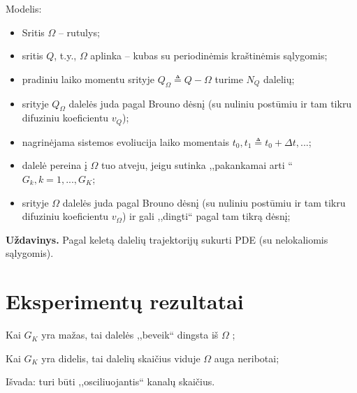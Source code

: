 \documentclass[10pt,a4paper]{article}
\begin{document}
Modelis:
\begin{itemize}
\item Sritis $\Omega$ – rutulys;
\item sritis $Q$, t.y.,    $\Omega$ aplinka – kubas su periodinėmis kraštinėmis sąlygomis;
\item pradiniu laiko momentu srityje $Q_\Omega \triangleq Q - \Omega$ turime $N_Q$ dalelių;
\item srityje $Q_\Omega$ dalelės juda pagal Brouno dėsnį (su nuliniu postūmiu ir tam tikru difuziniu koeficientu $v_Q$); 
\item nagrinėjama sistemos evoliucija  laiko momentais $t_0, t_1 \triangleq t_0 + \Delta t, ...$;
\item  dalelė pereina į $\Omega$ tuo atveju, jeigu sutinka ,,pakankamai arti `` $G_k, k=1,...,G_K$; 
\item srityje $\Omega$ dalelės juda pagal Brouno dėsnį (su nuliniu postūmiu ir tam tikru difuziniu koeficientu $v_\Omega$) ir gali ,,dingti`` pagal tam tikrą dėsnį; 
\end{itemize}

\textbf{Uždavinys.}
Pagal keletą dalelių trajektorijų sukurti PDE (su nelokaliomis sąlygomis).

\section*{Eksperimentų rezultatai}
\begin{list}{>}{Išvados}
\item Kai $G_K$  yra mažas, tai dalelės ,,beveik`` dingsta iš $\Omega$ ;
\item Kai $G_K$  yra didelis, tai dalelių skaičius viduje $\Omega$ auga neribotai;
\item Išvada: turi būti ,,osciliuojantis`` kanalų  skaičius.

\end{list}


   
\end{document}
